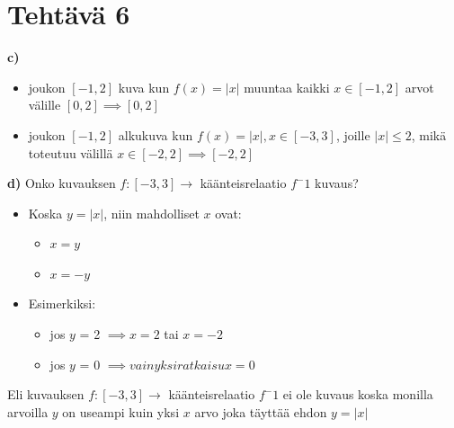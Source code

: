 \documentclass{article}
\begin{document}
        \section*{Tehtävä 6}
        \quad

        \textbf{c)}
        \begin{itemize}
            \item joukon $[-1, 2]$ kuva kun $f(x) = |x|$ muuntaa kaikki $x \in [-1, 2]$ arvot välille $[0, 2] \implies [0, 2]$
            \item joukon $[-1, 2]$ alkukuva kun $f(x) = |x|, x \in [-3, 3]$, joille $|x| \leq 2$, mikä toteutuu välillä $x \in [-2, 2] \implies [-2, 2]$
        \end{itemize}

        \textbf{d)}
        Onko kuvauksen $f : [-3, 3] \rightarrow $ käänteisrelaatio $f^-1$ kuvaus?
        \begin{itemize}
        \item Koska $y = |x|$, niin mahdolliset $x$ ovat:
            \begin{itemize}
                \item $x = y$
                \item $x = -y$
            \end{itemize}
        \item Esimerkiksi:
            \begin{itemize}
                \item jos $y$ = 2 $\implies x = 2$ tai $x = -2$
                \item jos $y$ = 0 $\implies vain yksi ratkaisu x = 0$
            \end{itemize}
        \end{itemize}
        Eli kuvauksen $f : [-3, 3] \rightarrow $ käänteisrelaatio $f^-1$ ei ole kuvaus koska monilla arvoilla $y$ on useampi kuin yksi $x$ arvo joka täyttää ehdon $y = |x|$
        
\end{document}
